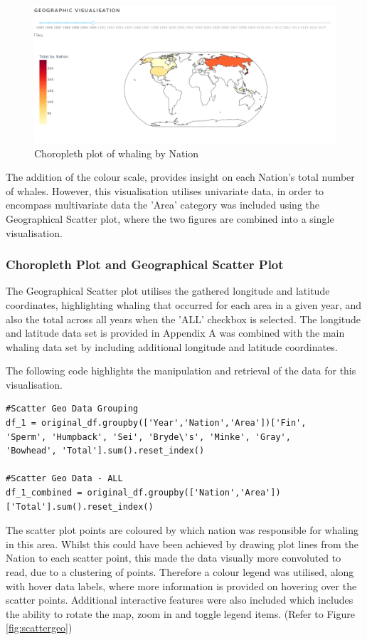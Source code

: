 \documentclass[12pt,a4paper]{article}
\begin{document}
\begin{figure}[H]
    \centering
    \includegraphics[width = 15cm]{Choropleth.png}
    \caption{Choropleth plot of whaling by Nation}
    \label{fig:world_fig1}
\end{figure}

The addition of the colour scale, provides insight on each Nation's total number of whales. However, this visualisation utilises univariate data, in order to encompass multivariate data the 'Area' category was included using the Geographical Scatter plot, where the two figures are combined into a single visualisation. 

\subsubsection{Choropleth Plot and Geographical Scatter Plot}
The Geographical Scatter plot utilises the gathered longitude and latitude coordinates, highlighting whaling that occurred for each area in a given year, and also the total across all years when the 'ALL' checkbox is selected. The longitude and latitude data set is provided in Appendix A was combined with the main whaling data set by including additional longitude and latitude coordinates.

The following code highlights the manipulation and retrieval of the data for this visualisation. 

\begin{verbatim}
#Scatter Geo Data Grouping
df_1 = original_df.groupby(['Year','Nation','Area'])['Fin', 
'Sperm', 'Humpback', 'Sei', 'Bryde\'s', 'Minke', 'Gray', 
'Bowhead', 'Total'].sum().reset_index()

#Scatter Geo Data - ALL
df_1_combined = original_df.groupby(['Nation','Area'])
['Total'].sum().reset_index()
\end{verbatim}


The scatter plot points are coloured by which nation was responsible for whaling in this area. Whilst this could have been achieved by drawing plot lines from the Nation to each scatter point, this made the data visually more convoluted to read, due to a clustering of points. Therefore a colour legend was utilised, along with hover data labels, where more information is provided on hovering over the scatter points.  Additional interactive features were also included which includes the ability to rotate the map, zoom in and toggle legend items. (Refer to Figure \ref{fig:scattergeo})
\end{document}
